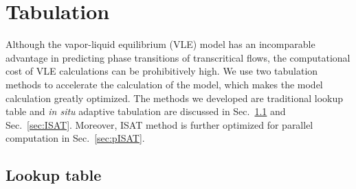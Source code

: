 \chapter{Tabulation}
\label{tabulation_chapter}

Although the vapor-liquid equilibrium (VLE) model has an incomparable advantage in predicting phase transitions of transcritical flows, the computational cost of VLE calculations can be prohibitively high. We use two tabulation methods to accelerate the calculation of the model, which makes the model calculation greatly optimized. The methods we developed are traditional lookup table and \textit{in situ} adaptive tabulation are discussed in Sec.~\ref{sec:tra-tab} and Sec.~\ref{sec:ISAT}. Moreover, ISAT method is further optimized for parallel computation in Sec.~\ref{sec:pISAT}.

\section{Lookup table} \label{sec:tra-tab} %


